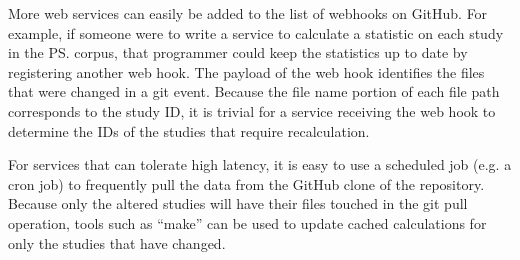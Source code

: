 \begin{methods}
More web services can easily be added to the list of webhooks on GitHub.
For example, if someone were to write a service to calculate a statistic on each study in the \ps corpus, that
    programmer could keep the statistics up to date by registering another web hook.
The payload of the web hook identifies the files that were changed in a git event.
Because the file name portion of each file path corresponds to the study ID, it is trivial for a service
    receiving the web hook to determine the IDs of the studies that require recalculation.

For services that can tolerate high latency, it is easy to use a scheduled job (e.g. a cron job) to 
    frequently pull the data from the GitHub clone of the repository.
Because only the altered studies will have their files touched in the git pull operation, tools such
    as ``make'' can be used to update cached calculations for only the studies that have changed.
\end{methods}
    
